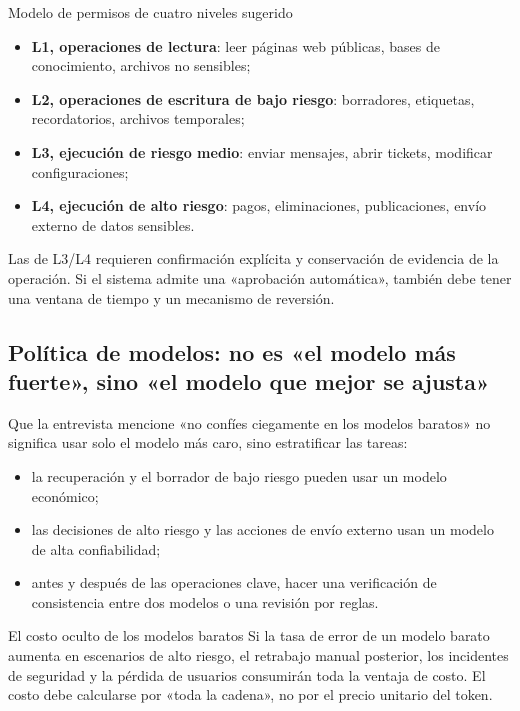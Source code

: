 \documentclass[a4paper]{article}
\begin{document}
\begin{knowledgebox}{Modelo de permisos de cuatro niveles sugerido}
\begin{itemize}
    \item \textbf{L1, operaciones de lectura}: leer páginas web públicas, bases de conocimiento, archivos no sensibles;
    \item \textbf{L2, operaciones de escritura de bajo riesgo}: borradores, etiquetas, recordatorios, archivos temporales;
    \item \textbf{L3, ejecución de riesgo medio}: enviar mensajes, abrir tickets, modificar configuraciones;
    \item \textbf{L4, ejecución de alto riesgo}: pagos, eliminaciones, publicaciones, envío externo de datos sensibles.
\end{itemize}
\end{knowledgebox}

Las de L3/L4 requieren confirmación explícita y conservación de evidencia de la operación. Si el sistema admite una «aprobación automática», también debe tener una ventana de tiempo y un mecanismo de reversión.

\subsection{Política de modelos: no es «el modelo más fuerte», sino «el modelo que mejor se ajusta»}

Que la entrevista mencione «no confíes ciegamente en los modelos baratos» no significa usar solo el modelo más caro, sino estratificar las tareas:
\begin{itemize}
    \item la recuperación y el borrador de bajo riesgo pueden usar un modelo económico;
    \item las decisiones de alto riesgo y las acciones de envío externo usan un modelo de alta confiabilidad;
    \item antes y después de las operaciones clave, hacer una verificación de consistencia entre dos modelos o una revisión por reglas.
\end{itemize}

\begin{warningbox}{El costo oculto de los modelos baratos}
Si la tasa de error de un modelo barato aumenta en escenarios de alto riesgo, el retrabajo manual posterior, los incidentes de seguridad y la pérdida de usuarios consumirán toda la ventaja de costo. El costo debe calcularse por «toda la cadena», no por el precio unitario del token.
\end{warningbox}
\end{document}
